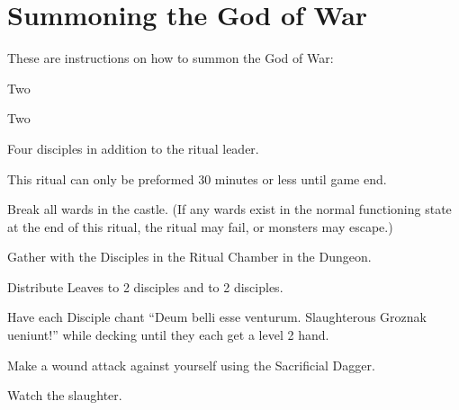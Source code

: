 \documentclass[green]{guildcamp2}
\begin{document}
\name{\gGoWrit{}}

\section{Summoning the God of War}
These are instructions on how to summon the God of War:

\begin{enum}[Requirements]
	\item \iHolyBook{}
	\item Two \iGingko{}
	\item Two \iBilberries{}
	\item \iDagger{}
	\item Four disciples in addition to the ritual leader.
	\item This ritual can only be preformed 30 minutes or less until game end.
\end{enum}

\begin{enum}[Directions]
	\item Break all wards in the castle. (If any wards exist in the normal functioning state at the end of this ritual, the ritual may fail, or monsters may escape.)
	\item Gather with the Disciples in the Ritual Chamber in the Dungeon.
	\item Distribute \iGingko{} Leaves to 2 disciples and \iBilberries{} to 2 disciples.
	\item Have each Disciple chant ``Deum belli esse venturum. Slaughterous Groznak ueniunt!'' while decking until they each get a level 2 hand.
	\item Make a wound attack against yourself using the Sacrificial Dagger.
	\item Watch the slaughter.
\end{enum}
	
\end{document}
